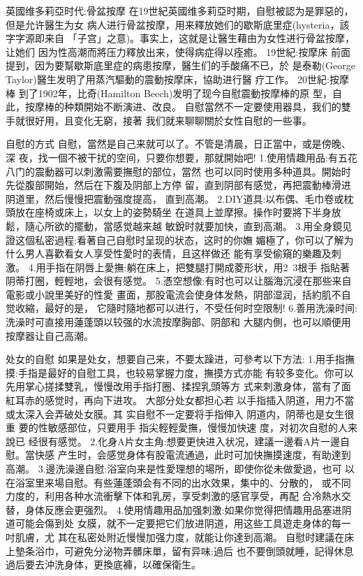 \documentclass[12pt,UTF8]{ctexbook}
\begin{document}
英國维多莉亞时代:骨盆按摩
在19世紀英國维多莉亞时期，自慰被認为是罪惡的，但是允许醫生为女
病人进行骨盆按摩，用来釋放她们的歇斯底里症(hysteria，該字字源即来自
「子宫」之意)。事实上，这就是让醫生藉由为女性进行骨盆按摩，让她们
因为性高潮而將压力釋放出来，使得病症得以痊癒。
19世紀:按摩床
前面提到，因为要幫歇斯底里症的病患按摩，醫生们的手酸痛不已，於
是泰勒(George Taylor)醫生发明了用蒸汽驅動的震動按摩床，協助进行醫
疗工作。
20世紀:按摩棒
到了1902年，比奇(Hamilton Beech)发明了现今自慰震動按摩棒的原
型，自此，按摩棒的种類開始不断演进、改良。
自慰當然不一定要使用器具，我们的雙手就很好用，且变化无窮，接著
我们就来聊聊關於女性自慰的一些事。

自慰的方式
自慰，當然是自己来就可以了。不管是清晨，日正當中，或是傍晚、深
夜，找一個不被干扰的空间，只要你想要，那就開始吧!
1.使用情趣用品:有五花八门的震動器可以刺激需要撫慰的部位，當然
也可以同时使用多种道具。開始时先從腹部開始，然后在下腹及阴部上方停
留，直到阴部有感觉，再把震動棒滑进阴道里，然后慢慢把震動强度提高，
直到高潮。
2.DIY道具:以布偶、毛巾卷或枕頭放在座椅或床上，以女上的姿勢騎坐
在道具上並摩擦。操作时要將下半身放鬆，隨心所欲的擺動，當感觉越来越
敏銳时就要加快，直到高潮。
3.用全身鏡见證这個私密過程:看著自己自慰时呈现的状态，这时的你嫵
媚極了，你可以了解为什么男人喜歡看女人享受性愛时的表情，且这样做还
能有享受偷窺的樂趣及刺激。
4.用手指在阴唇上愛撫:躺在床上，把雙腿打開成菱形状，用2~3根手
指貼著阴蒂打圈，輕輕地，会很有感觉。
5.憑空想像:有时也可以让腦海沉浸在那些来自電影或小說里美好的性愛
畫面，那股電流会使身体发熱，阴部湿润，括約肌不自觉收縮，最好的是，
它隨时隨地都可以进行，不受任何时空限制!
6.善用洗澡时间:洗澡时可直接用蓮蓬頭以较强的水流按摩胸部、阴部和
大腿内側，也可以順便用按摩器让自己高潮。

处女的自慰
如果是处女，想要自己来，不要太躁进，可參考以下方法:
1.用手指撫摸:手指是最好的自慰工具，也较易掌握力度，撫摸方式亦能
有较多变化。你可以先用掌心搓揉雙乳，慢慢改用手指打圈、揉捏乳頭等方
式来刺激身体，當有了面紅耳赤的感觉时，再向下进攻。
大部分处女都担心若
以手指插入阴道，用力不當
或太深入会弄破处女膜。其
实自慰不一定要将手指伸入
阴道内，阴蒂也是女生很重
要的性敏感部位，只要用手
指尖輕輕愛撫，慢慢加快速
度，对初次自慰的人来說已
经很有感觉。
2.化身A片女主角:想要更快进入状况，建議一邊看A片一邊自慰。當快感
产生时，会感觉身体有股電流通過，此时可加快撫摸速度，有助達到高潮。
3.邊洗澡邊自慰:浴室向来是性愛理想的場所，即使你從未做愛過，也可
以在浴室里来場自慰。有些蓮蓬頭会有不同的出水效果，集中的、分散的，
或不同力度的，利用各种水流衝擊下体和乳房，享受刺激的感官享受，再配
合冷熱水交替，身体反應会更强烈。
4.使用情趣用品加强刺激:如果你觉得把情趣用品塞进阴道可能会傷到处
女膜，就不一定要把它们放进阴道，用这些工具遊走身体的每一吋肌膚，尤
其在私密处附近慢慢加强力度，就能让你達到高潮。
自慰时建議在床上墊条浴巾，可避免分泌物弄髒床單，留有异味;過后
也不要倒頭就睡，記得休息過后要去沖洗身体，更換底褲，以確保衛生。
\end{document}
